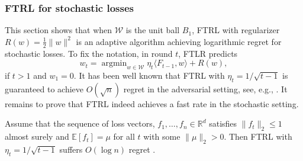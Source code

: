 \documentclass[english]{article}
\newcommand{\cW}{\mathcal{W}}
\newcommand{\Exp}[1]{\mathbb{E}\left[ #1 \right]}
\newcommand{\R}{\mathbb{R}}
\newcommand{\inpro}[2]{\langle #1, #2\rangle}
\DeclareMathOperator*{\argmin}{argmin}
\begin{document}
\subsubsection{FTRL for stochastic losses}
\label{subsubsec:FTRLunitball}
This section shows that when $\cW$ is the unit ball $B_1$, FTRL with regularizer $R(w) = \frac{1}{2}\|w\|^2$ is an adaptive algorithm achieving logarithmic regret for stochastic losses. To fix the notation, in round $t$, FTLR predicts
\[
	w_{t} = \argmin_{w\in \cW} \eta_t \inpro{F_{t-1}}{w} + R(w), 
\]
if $t >1$ and $w_1=0$.
It has been well known that FTRL with $\eta_t = 1/\sqrt{t-1}$ is guaranteed to achieve $O(\sqrt{n})$ regret in the adversarial setting, see, e.g., \citep{SS12:Book}. It remains to prove that FTRL indeed achieves a fast rate in the stochastic setting. 
\begin{theorem}
	Assume that the sequence of loss vectors, $f_1,\ldots,f_n \in \R^d$  satisfies $\|f_t\|_2 \le 1$ almost surely and $\Exp{f_t} = \mu$ for all $t$ with some $\|\mu\|_2 >0$. Then FTRL with $\eta_t=1/\sqrt{t-1}$ suffers $O(\log n)$ regret .
\end{theorem}
\end{document}
